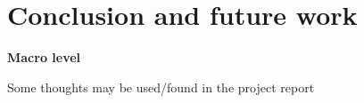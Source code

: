 
\chapter{Conclusion and future work}\label{chpt:conclusion}
\textbf{Macro level}

Some thoughts may be used/found in the project report

\cleardoublepage